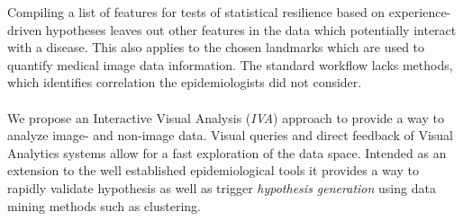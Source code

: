 \documentclass[journal]{style/vgtc} 			          %
\begin{document}
Compiling a list of features for tests of statistical resilience based on experience-driven hypotheses leaves out other features in the data which potentially interact with a disease.
%
This also applies to the chosen landmarks which are used to quantify medical image data information.
%
The standard workflow lacks methods, which identifies correlation the epidemiologists did not consider.
%
%
%
%
\\\\
We propose an Interactive Visual Analysis (\emph{IVA}) approach \cite{Thomas2005} to provide a way to analyze image- and non-image data.
%
Visual queries and direct feedback of Visual Analytics systems allow for a fast exploration of the data space.
%
Intended as an extension to the well established epidemiological tools it provides a way to rapidly validate hypothesis as well as trigger \emph{hypothesis generation} using data mining methods such as clustering.
\end{document}
